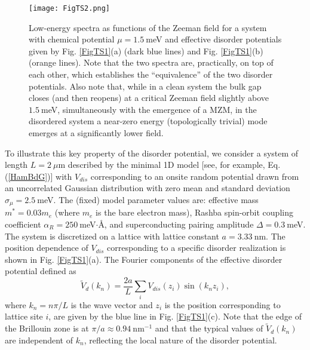 \documentclass[aps,prmaterials,twocolumn,superscriptaddress,longbibliography]{revtex4-2}
\begin{document}
\begin{figure}[t]
\begin{center}
\texttt{[image: FigTS2.png]}
\end{center}
\vspace{-3mm}
\caption{Low-energy spectra as  functions of the Zeeman field for a system with chemical potential $\mu=1.5~$meV and effective disorder potentials given by Fig. \ref{FigTS1}(a) (dark blue lines) and  Fig. \ref{FigTS1}(b) (orange lines). Note that the two spectra are, practically, on top of each other, which establishes the ``equivalence'' of the two disorder potentials. Also note that, while in a clean system the bulk gap closes (and then reopens) at a critical Zeeman field slightly above $1.5~$meV, simultaneously with the emergence of a MZM, in the disordered system a near-zero energy (topologically trivial) mode emerges at a significantly lower field.}
\label{FigTS2}
\vspace{-1mm}
\end{figure}

To illustrate this key  property of the disorder potential, we consider a system of length $L=2~\mu$m described by the minimal 1D model [see, for example, Eq. (\ref{HamBdG})] with $V_{dis}$ corresponding to an onsite random potential drawn from an uncorrelated Gaussian distribution with zero mean and standard deviation $\sigma_\mu = 2.5~$meV. The (fixed) model parameter values are: effective mass $m^* = 0.03 m_e$ (where $m_e$ is the bare electron mass), Rashba spin-orbit coupling coefficient $\alpha_R = 250~$meV$\cdot$\AA, and  superconducting pairing amplitude $\Delta = 0.3~$meV. The system is discretized on a lattice with lattice constant $a = 3.33~$nm. The position dependence of $V_{dis}$ corresponding to a specific disorder realization is shown in Fig. \ref{FigTS1}(a). The Fourier components of the effective disorder potential defined as
\begin{equation}
\widetilde{V}_d(k_n) = \frac{2a}{L}\sum_{i}V_{dis}(z_i) \sin(k_n z_i), \label{tildeV}
\end{equation}
where $k_n = n\pi/L$ is the wave vector and $z_i$ is the position corresponding to lattice site $i$, are given by the blue line in Fig. \ref{FigTS1}(c). Note that the edge of the Brillouin zone is at $\pi/a \approx 0.94~$nm$^{-1}$ and that the typical values of  $\widetilde{V}_d(k_n)$ are independent of $k_n$, reflecting the local nature of the disorder potential. 
\end{document}
